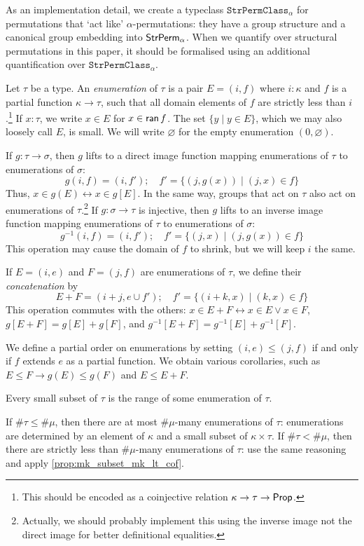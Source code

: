 As an implementation detail, we create a typeclass \( \texttt{StrPermClass}_\alpha \) for permutations that `act like' \( \alpha \)-permutations: they have a group structure and a canonical group embedding into \( \mathsf{StrPerm}_\alpha \).
When we quantify over structural permutations in this paper, it should be formalised using an additional quantification over \( \texttt{StrPermClass}_\alpha \).
\begin{definition}[enumeration]
  \label{def:Enumeration}
  Let \( \tau \) be a type.
  An \emph{enumeration} of \( \tau \) is a pair \( E = (i, f) \) where \( i : \kappa \) and \( f \) is a partial function \( \kappa \to \tau \), such that all domain elements of \( f \) are strictly less than \( i \).\footnote{This should be encoded as a coinjective relation \( \kappa \to \tau \to \mathsf{Prop} \).}
  If \( x : \tau \), we write \( x \in E \) for \( x \in \operatorname{\mathsf{ran}} f \).
  The set \( \{ y \mid y \in E \} \), which we may also loosely call \( E \), is small.
  We will write \( \varnothing \) for the empty enumeration \( (0, \varnothing) \).

  If \( g : \tau \to \sigma \), then \( g \) lifts to a direct image function mapping enumerations of \( \tau \) to enumerations of \( \sigma \):
  \[ g(i, f) = (i, f');\quad f' = \{ (j, g(x)) \mid (j, x) \in f \} \]
  Thus, \( x \in g(E) \leftrightarrow x \in g[E] \).
  In the same way, groups that act on \( \tau \) also act on enumerations of \( \tau \).\footnote{Actually, we should probably implement this using the inverse image not the direct image for better definitional equalities.}
  If \( g : \sigma \to \tau \) is injective, then \( g \) lifts to an inverse image function mapping enumerations of \( \tau \) to enumerations of \( \sigma \):
  \[ g^{-1}(i, f) = (i, f');\quad f' = \{ (j, x) \mid (j, g(x)) \in f \} \]
  This operation may cause the domain of \( f \) to shrink, but we will keep \( i \) the same.

  If \( E = (i, e) \) and \( F = (j, f) \) are enumerations of \( \tau \), we define their \emph{concatenation} by
  \[ E + F = (i + j, e \cup f');\quad f' = \{(i + k, x) \mid (k, x) \in f \} \]
  This operation commutes with the others: \( x \in E + F \leftrightarrow x \in E \vee x \in F \), \( g[E + F] = g[E] + g[F] \), and \( g^{-1}[E + F] = g^{-1}[E] + g^{-1}[F] \).

  We define a partial order on enumerations by setting \( (i, e) \leq (j, f) \) if and only if \( f \) extends \( e \) as a partial function.
  We obtain various corollaries, such as \( E \leq F \to g(E) \leq g(F) \) and \( E \leq E + F \).

  Every small subset of \( \tau \) is the range of some enumeration of \( \tau \).

  If \( \#\tau \leq \#\mu \), then there are at most \( \#\mu \)-many enumerations of \( \tau \): enumerations are determined by an element of \( \kappa \) and a small subset of \( \kappa \times \tau \).
  If \( \#\tau < \#\mu \), then there are strictly less than \( \#\mu \)-many enumerations of \( \tau \): use the same reasoning and apply \cref{prop:mk_subset_mk_lt_cof}.
\end{definition}
